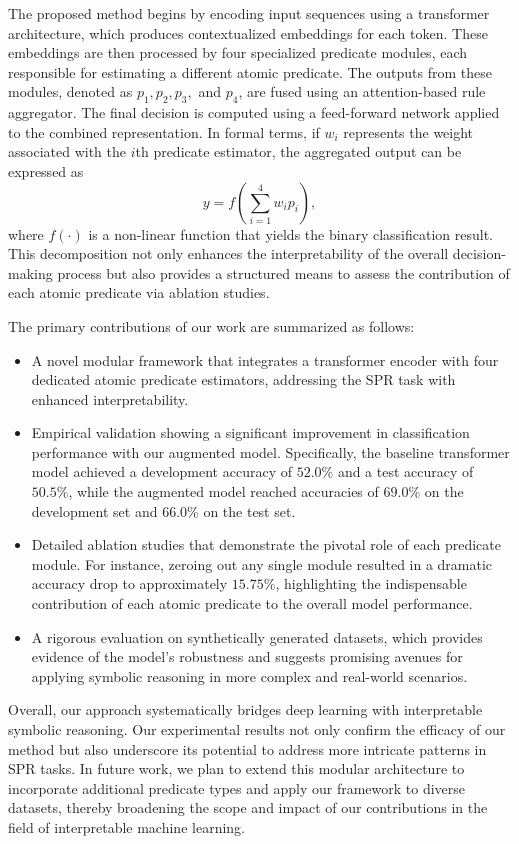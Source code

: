 \documentclass{article}
\begin{document}
The proposed method begins by encoding input sequences using a transformer architecture, which produces contextualized embeddings for each token. These embeddings are then processed by four specialized predicate modules, each responsible for estimating a different atomic predicate. The outputs from these modules, denoted as \( p_1, p_2, p_3, \) and \( p_4 \), are fused using an attention-based rule aggregator. The final decision is computed using a feed-forward network applied to the combined representation. In formal terms, if \( w_i \) represents the weight associated with the \( i \)th predicate estimator, the aggregated output can be expressed as 
\[
y = f\left(\sum_{i=1}^{4} w_i p_i\right),
\]
where \( f(\cdot) \) is a non-linear function that yields the binary classification result. This decomposition not only enhances the interpretability of the overall decision-making process but also provides a structured means to assess the contribution of each atomic predicate via ablation studies.

The primary contributions of our work are summarized as follows:
\begin{itemize}
    \item A novel modular framework that integrates a transformer encoder with four dedicated atomic predicate estimators, addressing the SPR task with enhanced interpretability.
    \item Empirical validation showing a significant improvement in classification performance with our augmented model. Specifically, the baseline transformer model achieved a development accuracy of \(52.0\%\) and a test accuracy of \(50.5\%\), while the augmented model reached accuracies of \(69.0\%\) on the development set and \(66.0\%\) on the test set.
    \item Detailed ablation studies that demonstrate the pivotal role of each predicate module. For instance, zeroing out any single module resulted in a dramatic accuracy drop to approximately \(15.75\%\), highlighting the indispensable contribution of each atomic predicate to the overall model performance.
    \item A rigorous evaluation on synthetically generated datasets, which provides evidence of the model's robustness and suggests promising avenues for applying symbolic reasoning in more complex and real-world scenarios.
\end{itemize}

Overall, our approach systematically bridges deep learning with interpretable symbolic reasoning. Our experimental results not only confirm the efficacy of our method but also underscore its potential to address more intricate patterns in SPR tasks. In future work, we plan to extend this modular architecture to incorporate additional predicate types and apply our framework to diverse datasets, thereby broadening the scope and impact of our contributions in the field of interpretable machine learning.
\end{document}
